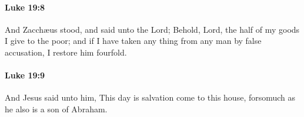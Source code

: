 		\paragraph{Luke 19:8} %
			\label{LUKE-19-8}

			And Zacchæus stood, and said unto the Lord; Behold, Lord, the half of my goods I give to the poor; and if I have taken any thing from any man by false accusation, I restore him fourfold.

			\begin{framed}
			\scriptsize
				\begin{compactdesc}
					\item[SBLG] 
				\end{compactdesc}
			\end{framed}

		\paragraph{Luke 19:9} %
			\label{LUKE-19-9}

			And Jesus said unto him, This day is salvation come to this house, forsomuch as he also is a son of Abraham.

